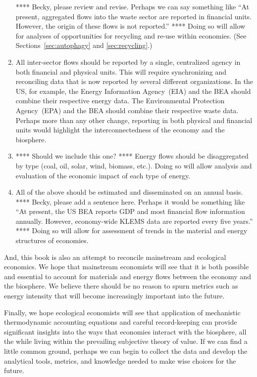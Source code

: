 \begin{enumerate}
{		 	**** Becky, please review and revise. 
			Perhaps we can say something like
			``At present, aggregated flows into the waste sector are reported in financial units. 
			However, the origin of these flows is not reported.'' ****
			Doing so will allow for analyses of opportunities for recycling and re-use
			within economies.
			(See Sections~\ref{sec:autophagy} and \ref{sec:recycling}.)}
	\item{All inter-sector flows should be reported by a single, centralized agency
			in both financial and physical units.
			This will require synchronizing and reconciling data that is now reported
			by several different organizations. 
			In the US, for example, the Energy Information Agency~(EIA) and the BEA
			should combine their respective energy data.
			The Environmental Protection Agency~(EPA) and the BEA 
			should combine their respective waste data.
			Perhaps more than any other change, 
			reporting in both physical and financial units 
			would highlight the interconnectedness
			of the economy and the biosphere.}
	\item{**** Should we include this one? **** Energy flows should be disaggregated by type 
			(coal, oil, solar, wind, biomass, etc.).
			Doing so will allow analysis and evaluation of the economic impact
			of each type of energy.}
	\item{All of the above should be estimated and disseminated on an annual basis.
			**** Becky, please add a sentence here. Perhaps it would be something like
			``At present, the US BEA reports GDP and most financial flow information 
			annually.
			However, economy-wide KLEMS data are reported every five years.'' ****
			Doing so will allow for assessment of trends 
			in the material and energy structures of economies.}
\end{enumerate}

And, this book is also an attempt to reconcile 
mainstream and ecological economics. 
We hope that mainstream economists will see that it is 
both possible and essential to account for materials and energy flows
between the economy and the biosphere.
We believe there should be no reason to spurn metrics such as energy intensity
that will become increasingly important into the future.

Finally, we hope ecological economists will see that 
application of mechanistic thermodynamic accounting equations
and careful record-keeping can provide significant
insights into the ways that economies interact
with the biosphere, all the while living within the 
prevailing subjective theory of value.
If we can find a little common ground, perhaps we can begin
to collect the data and develop the analytical tools, metrics, and knowledge
needed to make wise choices for the future.


